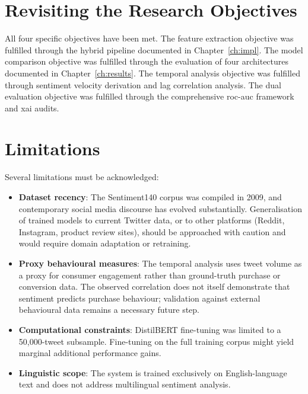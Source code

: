 \section{Revisiting the Research Objectives}

All four specific objectives have been met. The feature extraction objective was fulfilled through the hybrid pipeline documented in Chapter~\ref{ch:impl}. The model comparison objective was fulfilled through the evaluation of four architectures documented in Chapter~\ref{ch:results}. The temporal analysis objective was fulfilled through sentiment velocity derivation and lag correlation analysis. The dual evaluation objective was fulfilled through the comprehensive \gls{roc}-\gls{auc} framework and \gls{xai} audits.

\section{Limitations}

Several limitations must be acknowledged:

\begin{itemize}
  \item \textbf{Dataset recency}: The Sentiment140 corpus was compiled in 2009, and contemporary social media discourse has evolved substantially. Generalisation of trained models to current Twitter data, or to other platforms (Reddit, Instagram, product review sites), should be approached with caution and would require domain adaptation or retraining.

  \item \textbf{Proxy behavioural measures}: The temporal analysis uses tweet volume as a proxy for consumer engagement rather than ground-truth purchase or conversion data. The observed correlation does not itself demonstrate that sentiment predicts purchase behaviour; validation against external behavioural data remains a necessary future step.

  \item \textbf{Computational constraints}: DistilBERT fine-tuning was limited to a 50,000-tweet subsample. Fine-tuning on the full training corpus might yield marginal additional performance gains.

  \item \textbf{Linguistic scope}: The system is trained exclusively on English-language text and does not address multilingual sentiment analysis.
\end{itemize}

